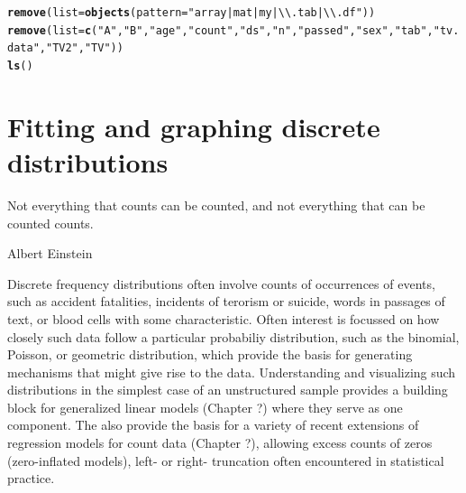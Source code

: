 \documentclass[11pt]{book}\usepackage[]{graphicx}\usepackage[]{color}
\makeatletter
\newcommand{\hlstr}[1]{\textcolor[rgb]{0.192,0.494,0.8}{#1}}%
\newcommand{\hlstd}[1]{\textcolor[rgb]{0.345,0.345,0.345}{#1}}%
\newcommand{\hlkwc}[1]{\textcolor[rgb]{0.333,0.667,0.333}{#1}}%
\newcommand{\hlkwd}[1]{\textcolor[rgb]{0.737,0.353,0.396}{\textbf{#1}}}%
\newenvironment{kframe}{%
 \def\at@end@of@kframe{}%
 \ifinner\ifhmode%
  \def\at@end@of@kframe{\end{minipage}}%
  \begin{minipage}{\columnwidth}%
 \fi\fi%
 \def\FrameCommand##1{\hskip\@totalleftmargin \hskip-\fboxsep
 \colorbox{shadecolor}{##1}\hskip-\fboxsep
     \hskip-\linewidth \hskip-\@totalleftmargin \hskip\columnwidth}%
 \MakeFramed {\advance\hsize-\width
   \@totalleftmargin\z@ \linewidth\hsize
   \@setminipage}}%
 {\par\unskip\endMakeFramed%
 \at@end@of@kframe}
\newenvironment{knitrout}{}{} %
\renewenvironment{knitrout}{\small\renewcommand{\baselinestretch}{.85}}{} %
\makeatother
\begin{document}
\begin{knitrout}
\color{fgcolor}\begin{kframe}
\begin{alltt}
\hlkwd{remove}\hlstd{(}\hlkwc{list}\hlstd{=}\hlkwd{objects}\hlstd{(}\hlkwc{pattern}\hlstd{=}\hlstr{"array|mat|my|\textbackslash{}\textbackslash{}.tab|\textbackslash{}\textbackslash{}.df"}\hlstd{))}
\hlkwd{remove}\hlstd{(}\hlkwc{list}\hlstd{=}\hlkwd{c}\hlstd{(}\hlstr{"A"}\hlstd{,} \hlstr{"B"}\hlstd{,} \hlstr{"age"}\hlstd{,} \hlstr{"count"}\hlstd{,} \hlstr{"ds"}\hlstd{,} \hlstr{"n"}\hlstd{,} \hlstr{"passed"}\hlstd{,} \hlstr{"sex"}\hlstd{,} \hlstr{"tab"}\hlstd{,} \hlstr{"tv.data"}\hlstd{,} \hlstr{"TV2"}\hlstd{,} \hlstr{"TV"}\hlstd{))}
\hlkwd{ls}\hlstd{()}
\end{alltt}
\end{kframe}
\end{knitrout}







\chapter{Fitting and graphing discrete distributions}\label{ch:discrete}


\epigraph{Not everything that counts can be counted, and not everything that
can be counted counts.}
{Albert Einstein}

Discrete frequency distributions often involve counts of occurrences of events,
such as accident fatalities, incidents of terorism or suicide,
words in passages of text, or blood cells with some characteristic.
Often interest is focussed on how closely such data follow a particular probabiliy distribution,
such as the binomial, Poisson, or geometric distribution, which
provide the basis for generating mechanisms that might give rise to the
data.
Understanding and visualizing
such distributions
in the simplest case of an unstructured sample provides a building block for generalized
linear models (Chapter ?) where they serve as one component.  The also provide the basis for
a variety of recent extensions of regression models for count data (Chapter ?),
allowing excess counts of zeros (zero-inflated models), left- or right-
truncation often encountered in statistical practice.
\end{document}
